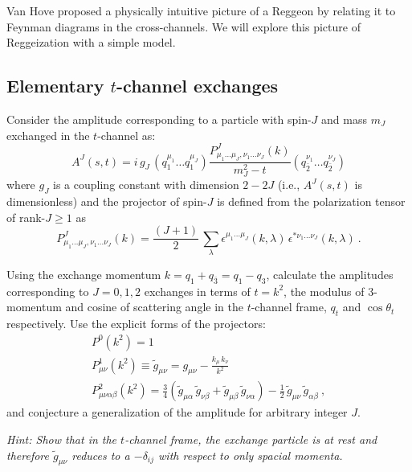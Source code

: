 

Van Hove proposed a physically intuitive picture of a Reggeon by relating it to Feynman diagrams in the cross-channels. We will explore this picture of Reggeization with a simple model.

\subsection{Elementary $t$-channel exchanges}
Consider the amplitude corresponding to a particle with spin-$J$ and mass $m_J$  exchanged in the $t$-channel as:
    \begin{equation}   
        \label{eq:AJ}
        A^J(s,t) = i \, g_J \, \left( q_1^{\mu_1} \dots q_1^{\mu_J} \right) \frac{P^J_{\mu_1\dots\mu_J,\nu_1\dots\nu_J}(k)}{m_J^2 - t} \left( q_{\bar{2}}^{\nu_1} \dots q_{\bar{2}}^{\nu_J} \right) 
    \end{equation}
where $g_J$ is a coupling constant with dimension $2-2J$ (i.e., $A^J(s,t)$ is dimensionless) and the projector of spin-$J$ is defined from the polarization tensor of rank-$J\geq1$ as
    \begin{equation}
        P^J_{\mu_1\dots\mu_J,\nu_1\dots\nu_J}(k) = \frac{(J+1)}{2} \, \sum_{\lambda} 
         \epsilon^{\mu_1\dots\mu_J}(k,\lambda) \, \epsilon^{*\nu_1\dots\nu_J}(k,\lambda) ~.
    \end{equation}

Using the exchange momentum $k = q_1 + q_{\bar{3}} = q_1 - q_3$, calculate the amplitudes corresponding to $J=0,1,2$ exchanges in terms of $t= k^2$, the modulus of 3-momentum and cosine of scattering angle in the $t$-channel frame, $q_t$ and $\cos\theta_t$ respectively. Use the explicit forms of the projectors:
    \begin{gather}
        P^0(k^2) = 1 \\
        P^1_{\mu\nu}(k^2) \equiv \tilde{g}_{\mu\nu} =   g_{\mu\nu}  - \frac{ k_\mu \, k_\nu}{ k^2}\\ 
        P^2_{\mu\nu\alpha\beta}(k^2) = \frac{3}{4}\left(\tilde{g}_{\mu\alpha} \, \tilde{g}_{\nu\beta} + \tilde{g}_{\mu\beta} \, \tilde{g}_{\nu\alpha}\right) - \frac{1}{2} \, \tilde{g}_{\mu\nu} \, \tilde{g}_{\alpha\beta} ~,
    \end{gather}
and conjecture a generalization of the amplitude for arbitrary integer $J$. 

\noindent\textit{Hint: Show that in the $t$-channel frame, the exchange particle is at rest and therefore $\tilde{g}_{\mu\nu}$ reduces to a $-\delta_{ij}$ with respect to only spacial momenta.} 

